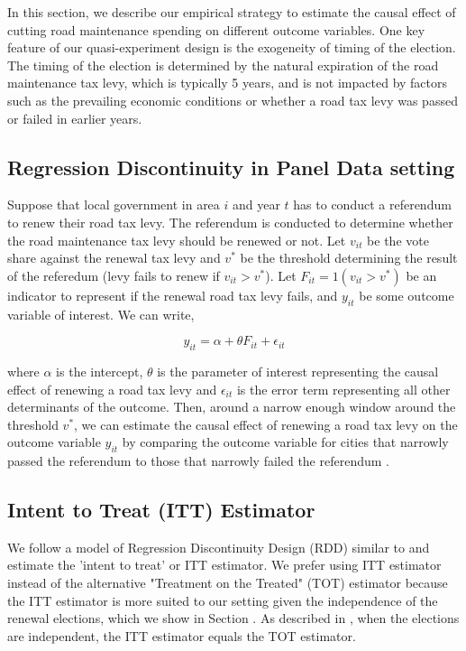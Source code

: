 In this section, we describe our empirical strategy to estimate the causal effect of cutting road maintenance spending on different outcome variables. One key feature of our quasi-experiment design is the exogeneity of timing of the election. The timing of the election is determined by the natural expiration of the road maintenance tax levy, which is typically 5 years, and is not impacted by factors such as the prevailing economic conditions or whether a road tax levy was passed or failed in earlier years.

\subsection{Regression Discontinuity in Panel Data setting}

Suppose that local government in area $i$ and year $t$ has to conduct a referendum to renew their road tax levy. The referendum is conducted to determine whether the road maintenance tax levy should be renewed or not. Let $v_{it}$ be the vote share against the renewal tax levy and  $v^*$ be the threshold determining the result of the referedum (levy fails to renew if $v_{it} > v^*$). Let $F_{it} = 1(v_{it} > v^*)$ be an indicator to represent if the renewal road tax levy fails, and $y_{it}$ be some outcome variable of interest. We can write,

$$
y_{it} = \alpha + \theta F_{it} + \epsilon_{it}
$$

where $\alpha$ is the intercept, $\theta$ is the parameter of interest representing the causal effect of renewing a road tax levy and $\epsilon_{it}$ is the error term representing all other determinants of the outcome. Then, around a narrow enough window around the threshold $v^*$, we can estimate the causal effect of renewing a road tax levy on the outcome variable $y_{it}$ by comparing the outcome variable for cities that narrowly passed the referendum to those that narrowly failed the referendum \cite{lee_lemieux2010}.

\subsection{Intent to Treat (ITT) Estimator}

We follow a model of Regression Discontinuity Design (RDD) similar to \cite{cellini2010value} and estimate the 'intent to treat' or ITT estimator. We prefer using ITT estimator instead of the alternative "Treatment on the Treated" (TOT) estimator because the ITT estimator is more suited to our setting given the independence of the renewal elections, which we show in Section . As described in \cite{cellini2010value}, when the elections are independent, the ITT estimator equals the TOT estimator.


